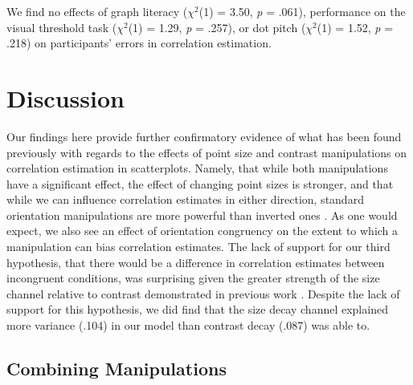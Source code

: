\documentclass[manuscript, anonymous, screen]{acmart}
\begin{document}
We find no effects of graph literacy (\(\chi^2\)(1) = 3.50, \emph{p} =
.061), performance on the visual threshold task (\(\chi^2\)(1) = 1.29,
\emph{p} = .257), or dot pitch (\(\chi^2\)(1) = 1.52, \emph{p} = .218)
on participants' errors in correlation estimation.

\hypertarget{sec-discussion}{%
\section{Discussion}\label{sec-discussion}}

Our findings here provide further confirmatory evidence of what has been
found previously with regards to the effects of point size and contrast
manipulations on correlation estimation in scatterplots. Namely, that
while both manipulations have a significant effect, the effect of
changing point sizes is stronger, and that while we can influence
correlation estimates in either direction, standard orientation
manipulations are more powerful than inverted ones
\citep{strain_2023, strain_2023b}. As one would expect, we also see an
effect of orientation congruency on the extent to which a manipulation
can bias correlation estimates. The lack of support for our third
hypothesis, that there would be a difference in correlation estimates
between incongruent conditions, was surprising given the greater
strength of the size channel relative to contrast demonstrated in
previous work \citep{strain_2023, strain_2023b}. Despite the lack of
support for this hypothesis, we did find that the size decay channel
explained more variance (.104) in our model than contrast decay (.087)
was able to.

\hypertarget{sec-combining}{%
\subsection{Combining Manipulations}\label{sec-combining}}
\end{document}
